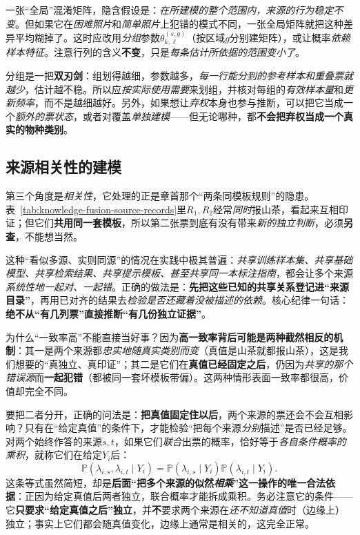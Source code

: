 一张“全局”混淆矩阵，隐含假设是：\emph{在所建模的整个范围内，来源的行为稳定不变}。但如果它在\emph{困难照片}和\emph{简单照片}上犯错的模式不同，一张全局矩阵就把这种差异平均糊掉了。这时应改用\emph{分组}参数$\theta^{(s,g)}_{k,\ell}$（按区域$g$分别建矩阵），或让概率\emph{依赖样本特征}。注意行列的含义\textbf{不变}，只是\emph{每条估计所依据的范围变小了}。

分组是一把\textbf{双刃剑}：组划得越细，参数越多，\emph{每一行能分到的参考样本和重叠票就越少}，估计越不稳。所以应\emph{按实际使用需要}来划组，并核对每组的\emph{有效样本量}和\emph{更新频率}，而不是越细越好。另外，如果想让\emph{弃权}本身也参与推断，可以把它当成一个\emph{额外的票状态}，或者对覆盖\emph{单独建模}——但无论哪种，都\textbf{不会把弃权当成一个真实的物种类别}。

\subsection{来源相关性的建模}
\label{sec:knowledge-fusion-correlation}

第三个角度是\emph{相关性}，它处理的正是章首那个“两条同模板规则”的隐患。表~\ref{tab:knowledge-fusion-source-records}里$R_1,R_2$经常\emph{同时}报山茶，看起来互相印证；但它们\textbf{共用同一套模板}，所以第二张票到底有没有带来\emph{新的独立判断}，必须\textbf{另查}，不能想当然。

这种“看似多源、实则同源”的情况在实践中极其普遍：\emph{共享训练样本集、共享基础模型、共享检索结果、共享提示模板、甚至共享同一本标注指南}，都会让多个来源\emph{系统性地一起对、一起错}。正确的做法是：\textbf{先把这些已知的共享关系登记进“来源目录”}，再用已对齐的结果去\emph{检验是否还藏着没被描述的依赖}。核心纪律一句话：\textbf{绝不从“有几列票”直接推断“有几份独立证据”}。

为什么“一致率高”不能直接当好事？因为\textbf{高一致率背后可能是两种截然相反的机制}：其一是两个来源都\emph{忠实地随真实类别而变}（真值是山茶就都报山茶），这是我们想要的“真独立、真印证”；其二是它们在\textbf{真值已经固定之后}，仍因为\emph{共享的那个错误源}而\textbf{一起犯错}（都被同一套坏模板带偏）。这两种情形表面一致率都很高，价值却完全不同。

要把二者分开，正确的问法是：\textbf{把真值固定住以后}，两个来源的票还会不会互相影响？只有在“给定真值”的条件下，才能检验“把每个来源\emph{分别}描述”是否已经足够。对两个始终作答的来源$s,t$，如果它们\emph{联合}出票的概率，恰好等于\emph{各自条件概率的乘积}，就称它们在给定$Y_i$后：
\begin{equation}
  \mathbb{P}(\lambda_{i,s},\lambda_{i,t}\mid Y_i)
  =
  \mathbb{P}(\lambda_{i,s}\mid Y_i)
  \mathbb{P}(\lambda_{i,t}\mid Y_i).
  \label{eq:knowledge-fusion-conditional-independence}
\end{equation}
这条等式虽然简短，却是\textbf{后面“把多个来源的似然\emph{相乘}”这一操作的唯一合法依据}：正因为给定真值后两者独立，联合概率才能拆成乘积。务必注意它的条件——它\textbf{只要求“给定真值之后”独立}，并\textbf{不}要求两个来源在\emph{还不知道真值}时（边缘上）独立；事实上它们都会随真值变化，边缘上通常是相关的，这完全正常。


